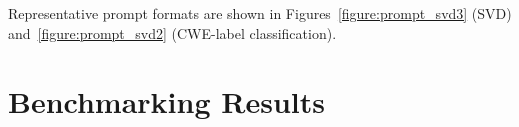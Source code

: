 \documentclass[lettersize,journal]{IEEEtran}
\begin{document}
Representative prompt formats are shown in Figures~\ref{figure:prompt_svd3} (\gls{SVD}) and~\ref{figure:prompt_svd2} (CWE-label classification).




\section{Benchmarking Results}
\label{section:results}
\end{document}
